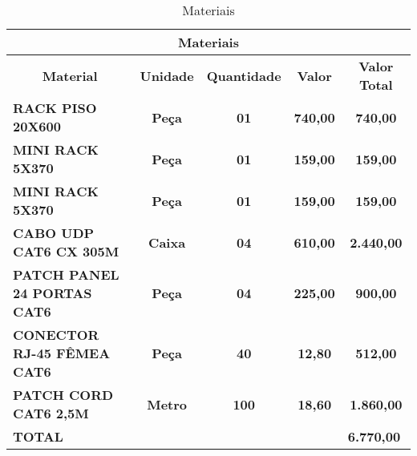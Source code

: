 \begin{table}[H]
\centering
\caption{Materiais}
\label{my-label}
\begin{tabular}{|l|c|c|c|c|}
\hline
\multicolumn{5}{|c|}{{\color[HTML]{000000} \textbf{Materiais}}}                                                                             \\ \hline
\multicolumn{1}{|c|}{\textbf{Material}} & \textbf{Unidade} & \textbf{Quantidade} & \textbf{Valor}  & \textbf{Valor Total}                   \\ \hline
\textbf{RACK PISO 20X600}               & \textbf{Peça}    & \textbf{01}         & \textbf{740,00} & \textbf{740,00}                        \\ \hline
\textbf{MINI RACK 5X370}                & \textbf{Peça}    & \textbf{01}         & \textbf{159,00} & \textbf{159,00}                        \\ \hline
\textbf{MINI RACK 5X370}                & \textbf{Peça}    & \textbf{01}         & \textbf{159,00} & \textbf{159,00}                        \\ \hline
\textbf{CABO UDP CAT6 CX 305M}          & \textbf{Caixa}   & \textbf{04}         & \textbf{610,00} & \textbf{2.440,00}                      \\ \hline
\textbf{PATCH PANEL 24 PORTAS CAT6}     & \textbf{Peça}    & \textbf{04}         & \textbf{225,00} & \textbf{900,00}                        \\ \hline
\textbf{CONECTOR RJ-45 FÊMEA CAT6}      & \textbf{Peça}    & \textbf{40}         & \textbf{12,80}  & \textbf{512,00}                        \\ \hline
\textbf{PATCH CORD CAT6 2,5M}           & \textbf{Metro}   & \textbf{100}        & \textbf{18,60}  & \textbf{1.860,00}                      \\ \hline
\multicolumn{4}{|l|}{\textbf{TOTAL}}                                                               & \multicolumn{1}{l|}{\textbf{6.770,00}} \\ \hline
\end{tabular}
\end{table}